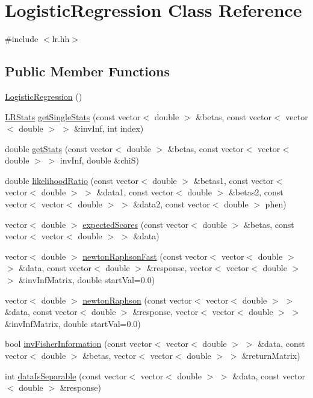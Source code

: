 \hypertarget{classLogisticRegression}{
\section{LogisticRegression Class Reference}
\label{classLogisticRegression}
}


{\ttfamily \#include $<$lr.hh$>$}

\subsection*{Public Member Functions}
\begin{DoxyCompactItemize}
\item 
\hyperlink{classLogisticRegression_ac052292dfeced0b7272e099e5ccb1dc3}{LogisticRegression} ()
\item 
\hyperlink{classLRStats}{LRStats} \hyperlink{classLogisticRegression_aae7d62475729b5b670759d24ea1a35ff}{getSingleStats} (const vector$<$ double $>$ \&betas, const vector$<$ vector$<$ double $>$ $>$ \&invInf, int index)
\item 
double \hyperlink{classLogisticRegression_a1dd5a75892af3383871e591c8ccb7905}{getStats} (const vector$<$ double $>$ \&betas, const vector$<$ vector$<$ double $>$ $>$ invInf, double \&chiS)
\item 
double \hyperlink{classLogisticRegression_a614dd5ad7eece3237edc37b56fced349}{likelihoodRatio} (const vector$<$ double $>$ \&betas1, const vector$<$ vector$<$ double $>$ $>$ \&data1, const vector$<$ double $>$ \&betas2, const vector$<$ vector$<$ double $>$ $>$ \&data2, const vector$<$ double $>$ phen)
\item 
vector$<$ double $>$ \hyperlink{classLogisticRegression_a8a7966506c2677d7426be408a7cb3f02}{expectedScores} (const vector$<$ double $>$ \&betas, const vector$<$ vector$<$ double $>$ $>$ \&data)
\item 
vector$<$ double $>$ \hyperlink{classLogisticRegression_a1724e4c7cc9a73db2712dbbbb9fbf204}{newtonRaphsonFast} (const vector$<$ vector$<$ double $>$ $>$ \&data, const vector$<$ double $>$ \&response, vector$<$ vector$<$ double $>$ $>$ \&invInfMatrix, double startVal=0.0)
\item 
vector$<$ double $>$ \hyperlink{classLogisticRegression_a298d29d0539412141a1e98205d1c4396}{newtonRaphson} (const vector$<$ vector$<$ double $>$ $>$ \&data, const vector$<$ double $>$ \&response, vector$<$ vector$<$ double $>$ $>$ \&invInfMatrix, double startVal=0.0)
\item 
bool \hyperlink{classLogisticRegression_ab61a51b6ca0816938b59bde88bc1082d}{invFisherInformation} (const vector$<$ vector$<$ double $>$ $>$ \&data, const vector$<$ double $>$ \&betas, vector$<$ vector$<$ double $>$ $>$ \&returnMatrix)
\item 
int \hyperlink{classLogisticRegression_a7de2efb78e07f9b46f34f8627fe8dae7}{dataIsSeparable} (const vector$<$ vector$<$ double $>$ $>$ \&data, const vector$<$ double $>$ \&response)
\end{DoxyCompactItemize}


